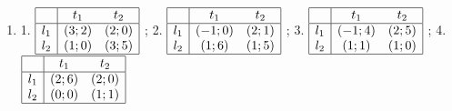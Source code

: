 \begin{problem}
\begin{enumerate}
\item	1.  $\begin{array}{|c|cc|}  \hline {} & {t_{1} } & {t_{2} } \\  \hline {l_{1} } & {\left(3;2\right)} & {\left(2;0\right)} \\ {l_{2} } & {\left(1;0\right)} & {\left(3;5\right)} \\  \hline  \end{array}$ ; 2.  $\begin{array}{|c|cc|}  \hline {} & {t_{1} } & {t_{2} } \\  \hline {l_{1} } & {\left(-1;0\right)} & {\left(2;1\right)} \\ {l_{2} } & {\left(1;6\right)} & {\left(1;5\right)} \\  \hline  \end{array}$ ; 3.  $\begin{array}{|c|cc|}  \hline {} & {t_{1} } & {t_{2} } \\  \hline {l_{1} } & {\left(-1;4\right)} & {\left(2;5\right)} \\ {l_{2} } & {\left(1;1\right)} & {\left(1;0\right)} \\  \hline  \end{array}$ ; 4.  $\begin{array}{|c|cc|}  \hline {} & {t_{1} } & {t_{2} } \\  \hline {l_{1} } & {\left(2;6\right)} & {\left(2;0\right)} \\ {l_{2} } & {\left(0;0\right)} & {\left(1;1\right)} \\  \hline  \end{array}$ \\

\end{enumerate}
\end{problem}
